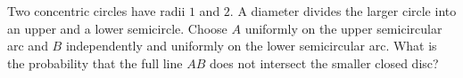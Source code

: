 Two concentric circles have radii $1$ and $2$. A diameter divides the larger circle into an upper and a lower semicircle. Choose $A$ uniformly on the upper semicircular arc and $B$ independently and uniformly on the lower semicircular arc. What is the probability that the full line $AB$ does not intersect the smaller closed disc?

